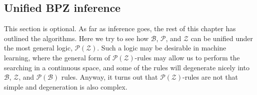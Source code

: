 %
%
%
%

\subsection{Unified BPZ inference}
\label{sec:unified-BPZ-inference}

This section is optional.  As far as inference goes, the rest of this chapter has outlined the algorithms.  Here we try to see how $\mathcal{B}$, $\mathcal{P}$, and $\mathcal{Z}$ can be unified under the most general logic, $\mathcal{P}(\mathcal{Z})$.  Such a logic may be desirable in machine learning, where the general form of $\mathcal{P}(\mathcal{Z})$-rules may allow us to perform the searching in a continuous space, and some of the rules will degenerate nicely into $\mathcal{B}$, $\mathcal{Z}$, and $\mathcal{P}(\mathcal{B})$ rules.  Anyway, it turns out that $\mathcal{P}(\mathcal{Z})$-rules are not that simple and degeneration is also complex.


